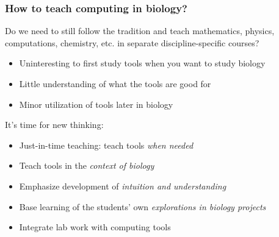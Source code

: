 \documentclass{beamer}
\begin{document}
\begin{frame}
\frametitle{How to teach computing in biology?}

\pause
\begin{block}{}
Do we need to still follow the tradition and teach mathematics, physics, computations, chemistry, etc. in separate discipline-specific courses?

\begin{itemize}
  \item Uninteresting to first study tools when you want to study biology

  \item Little understanding of what the tools are good for

  \item Minor utilization of tools later in biology
\end{itemize}

\noindent
\end{block}

\pause
\begin{block}{It's time for new thinking: }
\begin{itemize}
  \item Just-in-time teaching: teach tools \emph{when needed}

  \item Teach tools in the \emph{context of biology}

  \item Emphasize development of \emph{intuition and understanding}

  \item Base learning of the students' own \emph{explorations in biology projects}

  \item Integrate lab work with computing tools
\end{itemize}

\noindent
\end{block}
\end{frame}
\end{document}
